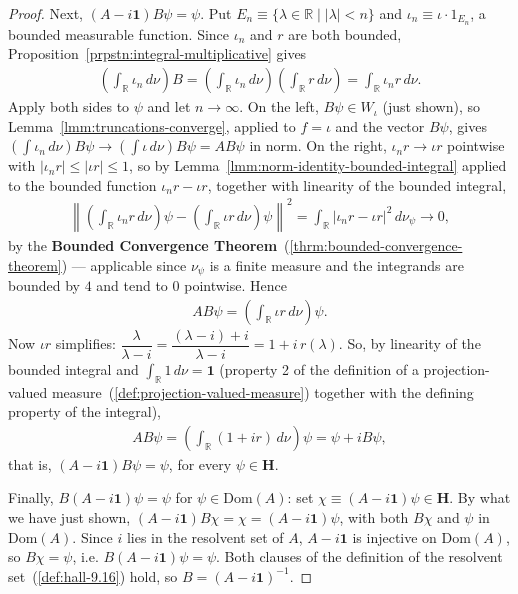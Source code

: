 \begin{proof}
Next, $(A - i\mathbf{1})B\psi = \psi$. Put $E_n \equiv \{ \lambda \in \mathbb{R} \mid \lvert \lambda \rvert < n \}$ and $\iota_n \equiv \iota\cdot 1_{E_n}$, a bounded measurable function. Since $\iota_n$ and $r$ are both bounded, Proposition~\ref{prpstn:integral-multiplicative} gives
\begin{align}
    \left( \int_{\mathbb{R}} \iota_n \, d\nu \right) B = \left( \int_{\mathbb{R}} \iota_n \, d\nu \right)\left( \int_{\mathbb{R}} r \, d\nu \right) = \int_{\mathbb{R}} \iota_n r \, d\nu.
\end{align}
Apply both sides to $\psi$ and let $n \to \infty$. On the left, $B\psi \in W_\iota$ (just shown), so Lemma~\ref{lmm:truncations-converge}, applied to $f = \iota$ and the vector $B\psi$, gives $\left( \int \iota_n \, d\nu \right)B\psi \to \left( \int \iota \, d\nu \right)B\psi = A B\psi$ in norm. On the right, $\iota_n r \to \iota r$ pointwise with $\lvert \iota_n r \rvert \le \lvert \iota r \rvert \le 1$, so by Lemma~\ref{lmm:norm-identity-bounded-integral} applied to the bounded function $\iota_n r - \iota r$, together with linearity of the bounded integral,
\begin{align}
    \left\| \left( \int_{\mathbb{R}} \iota_n r \, d\nu \right)\psi - \left( \int_{\mathbb{R}} \iota r \, d\nu \right)\psi \right\|^2 = \int_{\mathbb{R}} \lvert \iota_n r - \iota r \rvert^2 \, d\nu_\psi \longrightarrow 0,
\end{align}
by the \textbf{Bounded Convergence Theorem}~(\ref{thrm:bounded-convergence-theorem}) — applicable since $\nu_\psi$ is a finite measure and the integrands are bounded by $4$ and tend to $0$ pointwise. Hence
\begin{align}
    A B\psi = \left( \int_{\mathbb{R}} \iota r \, d\nu \right)\psi.
\end{align}
Now $\iota r$ simplifies: $\dfrac{\lambda}{\lambda-i} = \dfrac{(\lambda - i) + i}{\lambda - i} = 1 + i\,r(\lambda)$. So, by linearity of the bounded integral and $\int_{\mathbb{R}} 1 \, d\nu = \mathbf{1}$ (property 2 of the definition of a projection-valued measure~(\ref{def:projection-valued-measure}) together with the defining property of the integral),
\begin{align}
    A B\psi = \left( \int_{\mathbb{R}} (1 + ir) \, d\nu \right)\psi = \psi + i B\psi,
\end{align}
that is, $(A - i\mathbf{1})B\psi = \psi$, for every $\psi \in \mathbf{H}$.

Finally, $B(A-i\mathbf{1})\psi = \psi$ for $\psi \in \text{Dom}(A)$: set $\chi \equiv (A-i\mathbf{1})\psi \in \mathbf{H}$. By what we have just shown, $(A-i\mathbf{1})B\chi = \chi = (A - i\mathbf{1})\psi$, with both $B\chi$ and $\psi$ in $\text{Dom}(A)$. Since $i$ lies in the resolvent set of $A$, $A - i\mathbf{1}$ is injective on $\text{Dom}(A)$, so $B\chi = \psi$, i.e. $B(A-i\mathbf{1})\psi = \psi$. Both clauses of the definition of the resolvent set~(\ref{def:hall-9.16}) hold, so $B = (A-i\mathbf{1})^{-1}$.


\end{proof}
